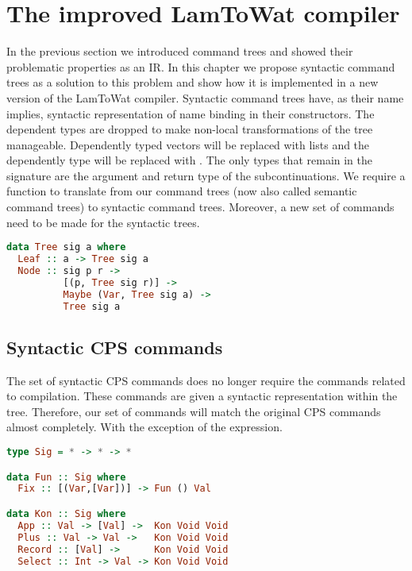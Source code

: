 
\chapter{\label{chap:bettercompiler}The improved LamToWat compiler}
In the previous section we introduced command trees and showed their problematic properties as an \ac{IR}. In this chapter we propose syntactic command trees as a solution to this problem and show how it is implemented in a new version of the LamToWat compiler. Syntactic command trees have, as their name implies, syntactic representation of name binding in their constructors. The dependent types are dropped to make non-local transformations of the tree manageable. Dependently typed vectors will be replaced with lists and the dependently type  will be replaced with . The only types that remain in the signature are the argument  and return type  of the subcontinuations. We require a function to translate from our command trees (now also called semantic command trees) to syntactic command trees. Moreover, a new set of commands need to be made for the syntactic trees.

\begin{lstlisting}[language=Haskell]
data Tree sig a where
  Leaf :: a -> Tree sig a
  Node :: sig p r ->
          [(p, Tree sig r)] ->
          Maybe (Var, Tree sig a) ->
          Tree sig a
\end{lstlisting}

\section{\label{section:syncomtree}Syntactic CPS commands}
The set of syntactic \ac{CPS} commands does no longer require the commands related to compilation. These commands are given a syntactic representation within the tree. Therefore, our set of commands will match the original \ac{CPS} commands almost completely. With the exception of the  expression.

\begin{lstlisting}[language=Haskell]
type Sig = * -> * -> *

data Fun :: Sig where
  Fix :: [(Var,[Var])] -> Fun () Val

data Kon :: Sig where
  App :: Val -> [Val] ->  Kon Void Void
  Plus :: Val -> Val ->   Kon Void Void
  Record :: [Val] ->      Kon Void Void
  Select :: Int -> Val -> Kon Void Void
\end{lstlisting}

